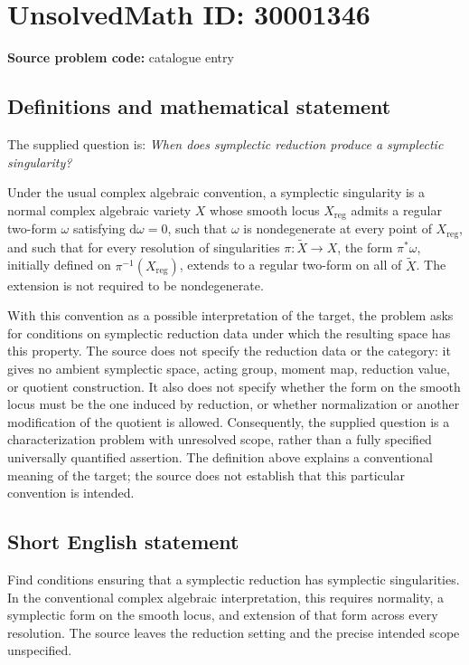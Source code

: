 \documentclass[11pt]{article}
\begin{document}
\section*{UnsolvedMath ID: 30001346}
\textbf{Source problem code:} catalogue entry
\subsection{Definitions and mathematical statement}
The supplied question is: \emph{When does symplectic reduction produce a symplectic singularity?}

Under the usual complex algebraic convention, a symplectic singularity is a normal complex algebraic variety \(X\) whose smooth locus \(X_{\mathrm{reg}}\) admits a regular two-form \(\omega\) satisfying \(\mathrm d\omega=0\), such that \(\omega\) is nondegenerate at every point of \(X_{\mathrm{reg}}\), and such that for every resolution of singularities \(\pi:\widetilde X\to X\), the form \(\pi^*\omega\), initially defined on \(\pi^{-1}(X_{\mathrm{reg}})\), extends to a regular two-form on all of \(\widetilde X\). The extension is not required to be nondegenerate.

With this convention as a possible interpretation of the target, the problem asks for conditions on symplectic reduction data under which the resulting space has this property. The source does not specify the reduction data or the category: it gives no ambient symplectic space, acting group, moment map, reduction value, or quotient construction. It also does not specify whether the form on the smooth locus must be the one induced by reduction, or whether normalization or another modification of the quotient is allowed. Consequently, the supplied question is a characterization problem with unresolved scope, rather than a fully specified universally quantified assertion. The definition above explains a conventional meaning of the target; the source does not establish that this particular convention is intended.
\subsection{Short English statement}
Find conditions ensuring that a symplectic reduction has symplectic singularities. In the conventional complex algebraic interpretation, this requires normality, a symplectic form on the smooth locus, and extension of that form across every resolution. The source leaves the reduction setting and the precise intended scope unspecified.
\end{document}

